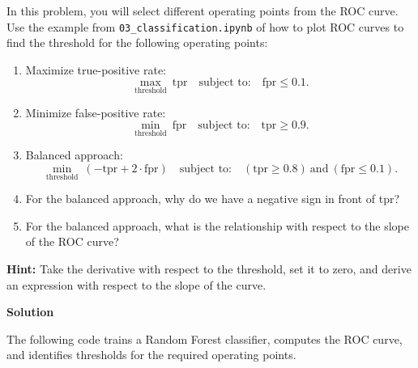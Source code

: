 \documentclass[11pt]{article}
\begin{document}
	In this problem, you will select different operating points from the ROC curve. Use the example from \texttt{03\_classification.ipynb} of how to plot ROC curves to find the threshold for the following operating points:
	
	\begin{enumerate}[label=\roman*.]
		
		\item Maximize true-positive rate:
		\[
		\max_{\text{threshold}} \ \text{tpr} 
		\quad \text{subject to:} \quad \text{fpr} \leq 0.1.
		\]
		
		\item Minimize false-positive rate:
		\[
		\min_{\text{threshold}} \ \text{fpr} 
		\quad \text{subject to:} \quad \text{tpr} \geq 0.9.
		\]
		
		\item Balanced approach:
		\[
		\min_{\text{threshold}} \ \left(-\text{tpr} + 2 \cdot \text{fpr}\right)
		\quad \text{subject to:} \quad (\text{tpr} \geq 0.8) \ \text{and} \ (\text{fpr} \leq 0.1).
		\]
		
		\item For the balanced approach, why do we have a negative sign in front of tpr?
		
		\item For the balanced approach, what is the relationship with respect to the slope of the ROC curve?
		
	\end{enumerate}
	
	\textbf{Hint:} Take the derivative with respect to the threshold, set it to zero, and derive an expression with respect to the slope of the curve.
	
	\textbf{Solution}
	
	The following code trains a Random Forest classifier, computes the ROC curve, and identifies thresholds for the required operating points.
\end{document}

